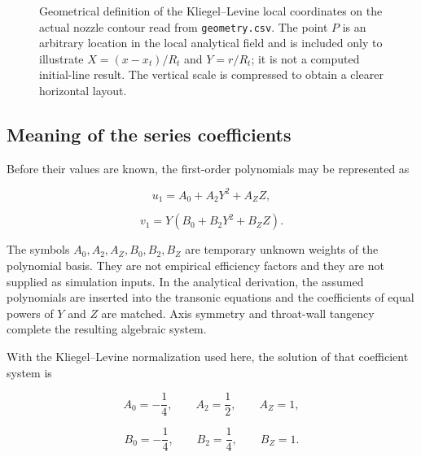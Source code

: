 \begin{landscape}
\begin{figure}[p]
{
}

\caption{Geometrical definition of the Kliegel--Levine local coordinates on
the actual nozzle contour read from \texttt{geometry.csv}.  The point \(P\) is
an arbitrary location in the local analytical field and is included only to
illustrate \(X=(x-x_t)/R_t\) and \(Y=r/R_t\); it is not a computed initial-line
result.  The vertical scale is compressed to obtain a clearer horizontal
layout.}
\label{fig:kl_actual_geometry_coordinates}

\end{figure}
\end{landscape}


\subsection{Meaning of the series coefficients}

Before their values are known, the first-order polynomials may be represented
as

\begin{equation}
    u_1=A_0+A_2Y^2+A_ZZ,
\end{equation}

\begin{equation}
    v_1=Y\left(B_0+B_2Y^2+B_ZZ\right).
\end{equation}

The symbols \(A_0,A_2,A_Z,B_0,B_2,B_Z\) are temporary unknown weights of
the polynomial basis.  They are not empirical efficiency factors and they are
not supplied as simulation inputs.  In the analytical derivation, the assumed
polynomials are inserted into the transonic equations and the coefficients of
equal powers of \(Y\) and \(Z\) are matched.  Axis symmetry and throat-wall
tangency complete the resulting algebraic system.

With the Kliegel--Levine normalization used here, the solution of that
coefficient system is

\begin{equation}
    A_0=-\frac14,
    \qquad
    A_2=\frac12,
    \qquad
    A_Z=1,
\end{equation}

\begin{equation}
    B_0=-\frac14,
    \qquad
    B_2=\frac14,
    \qquad
    B_Z=1.
\end{equation}

